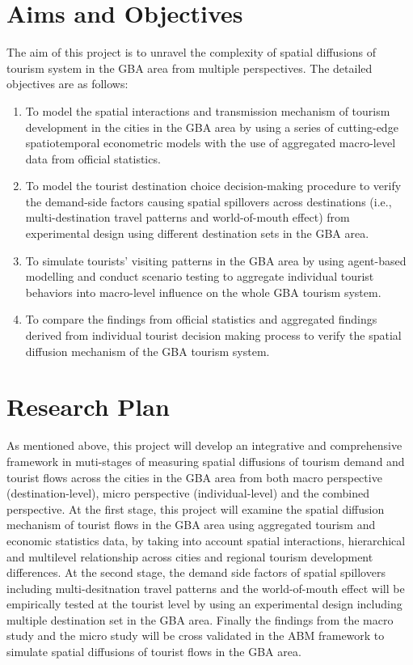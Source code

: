 \documentclass[11pt,a4paper]{amsart}
\theoremstyle{plain}
\theoremstyle{definition}
\begin{document}
\section{Aims and Objectives}
The aim of this project is to unravel the complexity of spatial diffusions of tourism system in the GBA area from multiple perspectives. The detailed objectives are as follows:
\begin{enumerate}
	\item To model the spatial interactions and transmission mechanism of tourism development in the cities in the GBA area by using a series of cutting-edge spatiotemporal econometric models with the use of aggregated macro-level data from official statistics.
	\item To model the tourist destination choice decision-making procedure to verify the demand-side factors causing spatial spillovers across destinations (i.e., multi-destination travel patterns and world-of-mouth effect) from experimental design using different destination sets in the GBA area. 
	\item To simulate tourists’ visiting patterns in the GBA area by using agent-based modelling and conduct scenario testing to aggregate individual tourist behaviors into macro-level influence on the whole GBA tourism system.
	\item To compare the findings from official statistics and aggregated findings derived from individual tourist decision making process to verify the spatial diffusion mechanism of the GBA tourism system.
\end{enumerate}

\section{Research Plan}\hfill\par 
\noindent As mentioned above, this project will develop an integrative and comprehensive framework in muti-stages of measuring spatial diffusions of tourism demand and tourist flows across the cities in the GBA area from both macro perspective (destination-level), micro perspective (individual-level) and the combined perspective. At the first stage, this project will examine the spatial diffusion mechanism of tourist flows in the GBA area using aggregated tourism and economic statistics data, by taking into account spatial interactions, hierarchical and multilevel relationship across cities and regional tourism development differences. At the second stage, the demand side factors of spatial spillovers including multi-desitnation travel patterns and the world-of-mouth effect will be empirically tested at the tourist level by using an experimental design including multiple destination set in the GBA area. Finally the findings from the macro study and the micro study will be cross validated in the ABM framework to simulate spatial diffusions of tourist flows in the GBA area.
\end{document}
